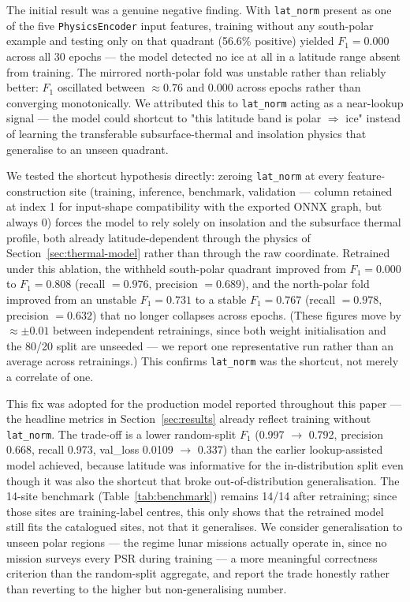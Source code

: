 \documentclass[12pt,a4paper]{article}
\begin{document}
The initial result was a genuine negative finding. With \texttt{lat\_norm} present
as one of the five \texttt{PhysicsEncoder} input features, training without any
south-polar example and testing only on that quadrant (56.6\% positive) yielded
$F_1 = 0.000$ across all 30 epochs — the model detected no ice at all in a
latitude range absent from training. The mirrored north-polar fold was unstable
rather than reliably better: $F_1$ oscillated between $\approx 0.76$ and $0.000$
across epochs rather than converging monotonically. We attributed this to
\texttt{lat\_norm} acting as a near-lookup signal — the model could shortcut to
"this latitude band is polar $\Rightarrow$ ice" instead of learning the
transferable subsurface-thermal and insolation physics that generalise to an
unseen quadrant.

We tested the shortcut hypothesis directly: zeroing \texttt{lat\_norm} at every
feature-construction site (training, inference, benchmark, validation —
column retained at index 1 for input-shape compatibility with the exported ONNX
graph, but always 0) forces the model to rely solely on insolation and the
subsurface thermal profile, both already latitude-dependent through the physics
of Section~\ref{sec:thermal-model} rather than through the raw coordinate. Retrained
under this ablation, the withheld south-polar quadrant improved from
$F_1 = 0.000$ to $F_1 = 0.808$ (recall $= 0.976$, precision $= 0.689$), and the
north-polar fold improved from an unstable $F_1 = 0.731$ to a stable
$F_1 = 0.767$ (recall $= 0.978$, precision $= 0.632$) that no longer collapses
across epochs. (These figures move by $\approx \pm 0.01$ between independent
retrainings, since both weight initialisation and the 80/20 split are
unseeded — we report one representative run rather than an average across
retrainings.) This confirms \texttt{lat\_norm} was the shortcut, not merely a
correlate of one.

This fix was adopted for the production model reported throughout this paper —
the headline metrics in Section~\ref{sec:results} already reflect training
without \texttt{lat\_norm}. The trade-off is a lower random-split $F_1$
(0.997 $\rightarrow$ 0.792, precision 0.668, recall 0.973, val\_loss
0.0109 $\rightarrow$ 0.337) than the earlier lookup-assisted model achieved,
because latitude was informative for the in-distribution split even though it
was also the shortcut that broke out-of-distribution generalisation. The
14-site benchmark (Table~\ref{tab:benchmark}) remains 14/14 after retraining;
since those sites are training-label centres, this only shows that the
retrained model still fits the catalogued sites, not that it generalises. We
consider generalisation to unseen polar regions — the regime lunar missions
actually operate in, since no mission surveys every PSR during training — a
more meaningful correctness criterion than the random-split aggregate, and
report the trade honestly rather than reverting to the higher but
non-generalising number.
\end{document}
